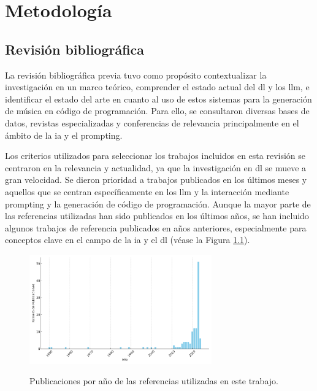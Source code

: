 \chapter{Metodología}





\section{Revisión bibliográfica}

La revisión bibliográfica previa tuvo como propósito contextualizar la investigación en un marco teórico, comprender el estado actual del \gls{dl} y los \gls{llm}, e identificar el estado del arte en cuanto al uso de estos sistemas para la generación de música en código de programación.
Para ello, se consultaron diversas bases de datos, revistas especializadas y conferencias de relevancia principalmente en el ámbito de la \gls{ia} y el prompting. 

Los criterios utilizados para seleccionar los trabajos incluidos en esta revisión se centraron en la relevancia y actualidad, ya que la investigación en \gls{dl} se mueve a gran velocidad. Se dieron prioridad a trabajos publicados en los últimos meses y aquellos que se centran específicamente en  los \gls{llm} y la interacción mediante prompting y la generación de código de programación.
Aunque la mayor parte de las referencias utilizadas han sido publicados en los últimos años, se han incluido algunos trabajos de referencia publicados en años anteriores, especialmente para conceptos clave en el campo de la \gls{ia} y el \gls{dl} (véase la Figura \ref{fig:publications_per_year_referencias}).

\begin{figure}[h]
    \caption[Publicaciones por año de las referencias utilizadas]{Publicaciones por año de las referencias utilizadas en este trabajo.}
    \centering
    \includegraphics[width=0.7\textwidth]{./figuras/publications_per_year_referencias.png}
    \source{\propio}
    \label{fig:publications_per_year_referencias}
\end{figure}



